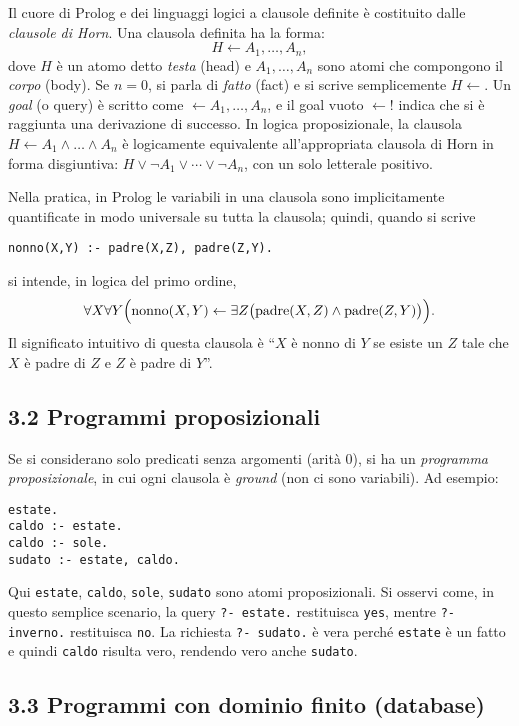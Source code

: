 \documentclass[12pt]{article}
\begin{document}
Il cuore di Prolog e dei linguaggi logici a clausole definite è costituito dalle \emph{clausole di Horn}. Una clausola definita ha la forma:
\[
  H \leftarrow A_1, \dots, A_n,
\]
dove $H$ è un atomo detto \emph{testa} (head) e $A_1,\dots,A_n$ sono atomi che compongono il \emph{corpo} (body). Se $n=0$, si parla di \emph{fatto} (fact) e si scrive semplicemente $H\leftarrow$. Un \emph{goal} (o query) è scritto come $\leftarrow A_1,\dots,A_n$, e il goal vuoto $\leftarrow !$ indica che si è raggiunta una derivazione di successo. In logica proposizionale, la clausola $H\leftarrow A_1\land \dots\land A_n$ è logicamente equivalente all'appropriata clausola di Horn in forma disgiuntiva: $H\vee \neg A_1 \vee \cdots \vee \neg A_n$, con un solo letterale positivo.

Nella pratica, in Prolog le variabili in una clausola sono implicitamente quantificate in modo universale su tutta la clausola; quindi, quando si scrive
\begin{verbatim}
nonno(X,Y) :- padre(X,Z), padre(Z,Y).
\end{verbatim}
si intende, in logica del primo ordine, 
\[
  \forall X\forall Y\Bigl(\text{nonno}(X,Y)\leftarrow \exists Z\bigl(\text{padre}(X,Z)\land \text{padre}(Z,Y)\bigr)\Bigr).
\]
Il significato intuitivo di questa clausola è “$X$ è nonno di $Y$ se esiste un $Z$ tale che $X$ è padre di $Z$ e $Z$ è padre di $Y$”.

\subsection*{3.2 Programmi proposizionali}

Se si considerano solo predicati senza argomenti (arità 0), si ha un \emph{programma proposizionale}, in cui ogni clausola è \emph{ground} (non ci sono variabili). Ad esempio:
\begin{verbatim}
estate.
caldo :- estate.
caldo :- sole.
sudato :- estate, caldo.
\end{verbatim}
Qui \texttt{estate}, \texttt{caldo}, \texttt{sole}, \texttt{sudato} sono atomi proposizionali. Si osservi come, in questo semplice scenario, la query \texttt{?- estate.} restituisca \texttt{yes}, mentre \texttt{?- inverno.} restituisca \texttt{no}. La richiesta \texttt{?- sudato.} è vera perché \texttt{estate} è un fatto e quindi \texttt{caldo} risulta vero, rendendo vero anche \texttt{sudato}.

\subsection*{3.3 Programmi con dominio finito (database)}
\end{document}
